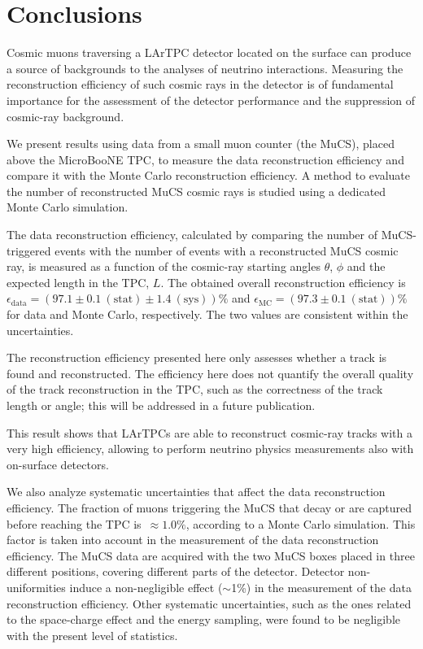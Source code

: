 \documentclass[a4paper,11pt]{article}
\begin{document}
\section{Conclusions}
Cosmic muons traversing a LArTPC detector located on the surface can produce a source of backgrounds to the analyses of neutrino interactions. Measuring the reconstruction efficiency of such cosmic rays in the detector is of fundamental importance for the assessment of the detector performance and the suppression of cosmic-ray background.

We present results using data from a small muon counter (the MuCS), placed above the MicroBooNE TPC, to measure the data reconstruction efficiency and compare it with the Monte Carlo reconstruction efficiency.
A method to evaluate the number of reconstructed MuCS cosmic rays is studied using a dedicated Monte Carlo simulation.

The data reconstruction efficiency, calculated by comparing the number of MuCS-triggered events with the number of events with a reconstructed MuCS cosmic ray, is measured as a function of the cosmic-ray starting angles $\theta$, $\phi$ and the expected length in the TPC, $L$. The obtained overall reconstruction efficiency is $\epsilon_{\mathrm{data}}=(97.1 \pm 0.1~\mathrm{(stat)} \pm 1.4~\mathrm{(sys)})\%$ and $\epsilon_{\mathrm{MC}} = (97.3 \pm 0.1~\mathrm{(stat)})\%$ for data and Monte Carlo, respectively. The two values are consistent within the uncertainties.

The reconstruction efficiency presented here only assesses whether a track is found and reconstructed. The efficiency here does not quantify the overall quality of the track reconstruction in the TPC, such as the correctness of the track length or angle; this will be addressed in a future publication.

This result shows that LArTPCs are able to reconstruct cosmic-ray tracks with a very high efficiency, allowing to perform neutrino physics measurements also with on-surface detectors.

We also analyze systematic uncertainties that affect the data reconstruction efficiency. The fraction of muons triggering the MuCS that decay or are captured before reaching the TPC is~$\approx1.0\%$, according to a Monte Carlo simulation.  This factor is taken into account in the measurement of the data reconstruction efficiency.
The MuCS data are acquired with the two MuCS boxes placed in three different positions, covering different parts of the detector. Detector non-uniformities induce a non-negligible effect ($\sim$1\%) in the measurement of the data reconstruction efficiency. Other systematic uncertainties, such as the ones related to the space-charge effect and the energy sampling, were found to be negligible with the present level of statistics.
\end{document}
